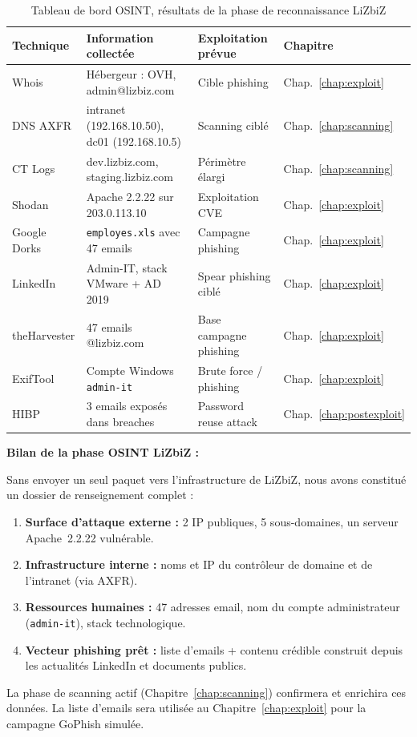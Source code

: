 \begin{table}[htbp]
\centering
\caption{Tableau de bord OSINT, résultats de la phase de reconnaissance LiZbiZ}
\label{tab:synthese_osint}
\begin{tabular}{p{3cm}p{4cm}p{5.5cm}p{2cm}}
\toprule
\textbf{Technique} & \textbf{Information collectée} & \textbf{Exploitation prévue} & \textbf{Chapitre} \\
\midrule
Whois
    & Hébergeur : OVH, admin@lizbiz.com
    & Cible phishing
    & Chap.~\ref{chap:exploit} \\
\addlinespace
DNS AXFR
    & intranet (192.168.10.50), dc01 (192.168.10.5)
    & Scanning ciblé
    & Chap.~\ref{chap:scanning} \\
\addlinespace
CT Logs
    & dev.lizbiz.com, staging.lizbiz.com
    & Périmètre élargi
    & Chap.~\ref{chap:scanning} \\
\addlinespace
Shodan
    & Apache 2.2.22 sur 203.0.113.10
    & Exploitation CVE
    & Chap.~\ref{chap:exploit} \\
\addlinespace
Google Dorks
    & \texttt{employes.xls} avec 47 emails
    & Campagne phishing
    & Chap.~\ref{chap:exploit} \\
\addlinespace
LinkedIn
    & Admin-IT, stack VMware + AD 2019
    & Spear phishing ciblé
    & Chap.~\ref{chap:exploit} \\
\addlinespace
theHarvester
    & 47 emails @lizbiz.com
    & Base campagne phishing
    & Chap.~\ref{chap:exploit} \\
\addlinespace
ExifTool
    & Compte Windows \texttt{admin-it}
    & Brute force / phishing
    & Chap.~\ref{chap:exploit} \\
\addlinespace
HIBP
    & 3 emails exposés dans breaches
    & Password reuse attack
    & Chap.~\ref{chap:postexploit} \\
\bottomrule
\end{tabular}
\end{table}

\begin{boxlizbiz}
\textbf{Bilan de la phase OSINT LiZbiZ :}

Sans envoyer un seul paquet vers l'infrastructure de LiZbiZ, nous avons
constitué un dossier de renseignement complet :
\begin{enumerate}
    \item \textbf{Surface d'attaque externe :} 2 IP publiques, 5 sous-domaines,
          un serveur Apache~2.2.22 vulnérable.
    \item \textbf{Infrastructure interne :} noms et IP du contrôleur de domaine
          et de l'intranet (via AXFR).
    \item \textbf{Ressources humaines :} 47 adresses email, nom du compte
          administrateur (\texttt{admin-it}), stack technologique.
    \item \textbf{Vecteur phishing prêt :} liste d'emails + contenu crédible
          construit depuis les actualités LinkedIn et documents publics.
\end{enumerate}
La phase de scanning actif (Chapitre~\ref{chap:scanning}) confirmera et
enrichira ces données. La liste d'emails sera utilisée au
Chapitre~\ref{chap:exploit} pour la campagne GoPhish simulée.
\end{boxlizbiz}

